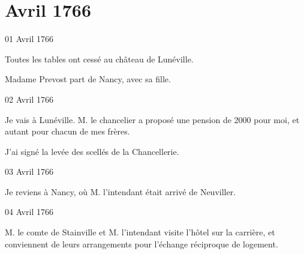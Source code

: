                   \chapter*{Avril 1766}


                     \begin{diary}{01 Avril 1766}{}

                         Toutes les tables ont cessé au château de
                              Lunéville. \bigskip



                           Madame Prevost part de Nancy, avec sa
                              fille. \bigskip


                     \end{diary}

                     \begin{diary}{02 Avril 1766}{}

                         Je vais à Lunéville. M. le
                              chancelier
                           a proposé une pension de 2000 pour
                           moi, et autant pour chacun de mes frères. \bigskip


                         J'ai signé la levée des scellés de
                              la Chancellerie. \bigskip


                     \end{diary}

                     \begin{diary}{03 Avril 1766}{}

                         Je reviens à Nancy, où M.
                              l'intendant
                           était arrivé de Neuviller. \bigskip


                     \end{diary}

                     \begin{diary}{04 Avril 1766}{}


                           M. le comte de Stainville et
                              M. l'intendant
                           visite l'hôtel sur la
                              carrière, et conviennent
                           de leurs arrangements pour l'échange
                           réciproque de logement. \bigskip


                     \end{diary}


